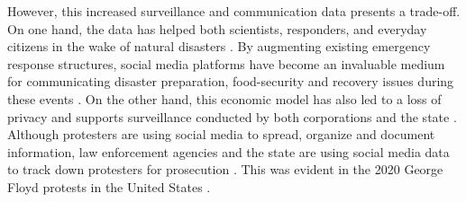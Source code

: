 \documentclass{article}
\begin{document}
However, this increased surveillance and communication data presents a trade-off. On one hand, the data has helped both scientists, responders, and everyday citizens in the wake of natural disasters \cite{CNBC2020twitterclimatechange, moore2020using}. By augmenting existing emergency response structures, social media platforms have become an invaluable medium for communicating disaster preparation, food-security and recovery issues during these events \cite{moore2020using, CNBC2020twitterclimatechange, niles2019social}. On the other hand, this economic model has also led to a loss of privacy and supports surveillance conducted by both corporations and the state \cite{landwehr2019high}. Although protesters are using social media to spread, organize and document information, law enforcement agencies and the state are using social media data to track down protesters for prosecution \cite{owen2017monitoring}. This was evident in the 2020 George Floyd protests in the United States \cite{businessinsider2020georgefloyd}. 






\end{document}

